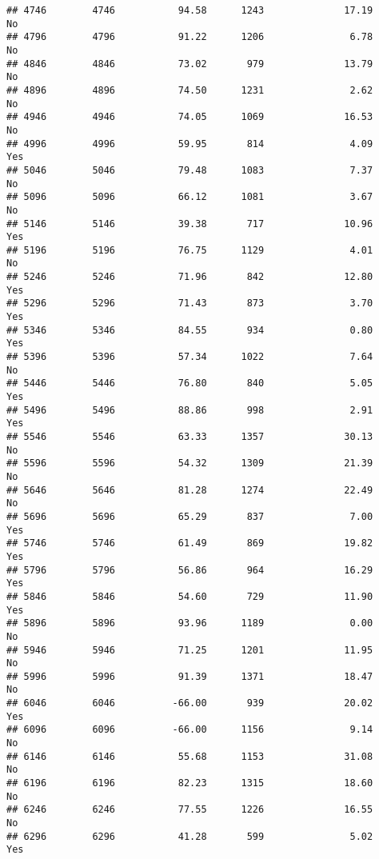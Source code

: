 \documentclass[
]{article}
\begin{document}
\begin{verbatim}
## 4746        4746           94.58      1243              17.19                No
## 4796        4796           91.22      1206               6.78                No
## 4846        4846           73.02       979              13.79                No
## 4896        4896           74.50      1231               2.62                No
## 4946        4946           74.05      1069              16.53                No
## 4996        4996           59.95       814               4.09               Yes
## 5046        5046           79.48      1083               7.37                No
## 5096        5096           66.12      1081               3.67                No
## 5146        5146           39.38       717              10.96               Yes
## 5196        5196           76.75      1129               4.01                No
## 5246        5246           71.96       842              12.80               Yes
## 5296        5296           71.43       873               3.70               Yes
## 5346        5346           84.55       934               0.80               Yes
## 5396        5396           57.34      1022               7.64                No
## 5446        5446           76.80       840               5.05               Yes
## 5496        5496           88.86       998               2.91               Yes
## 5546        5546           63.33      1357              30.13                No
## 5596        5596           54.32      1309              21.39                No
## 5646        5646           81.28      1274              22.49                No
## 5696        5696           65.29       837               7.00               Yes
## 5746        5746           61.49       869              19.82               Yes
## 5796        5796           56.86       964              16.29               Yes
## 5846        5846           54.60       729              11.90               Yes
## 5896        5896           93.96      1189               0.00                No
## 5946        5946           71.25      1201              11.95                No
## 5996        5996           91.39      1371              18.47                No
## 6046        6046          -66.00       939              20.02               Yes
## 6096        6096          -66.00      1156               9.14                No
## 6146        6146           55.68      1153              31.08                No
## 6196        6196           82.23      1315              18.60                No
## 6246        6246           77.55      1226              16.55                No
## 6296        6296           41.28       599               5.02               Yes

\end{verbatim}
\end{document}
